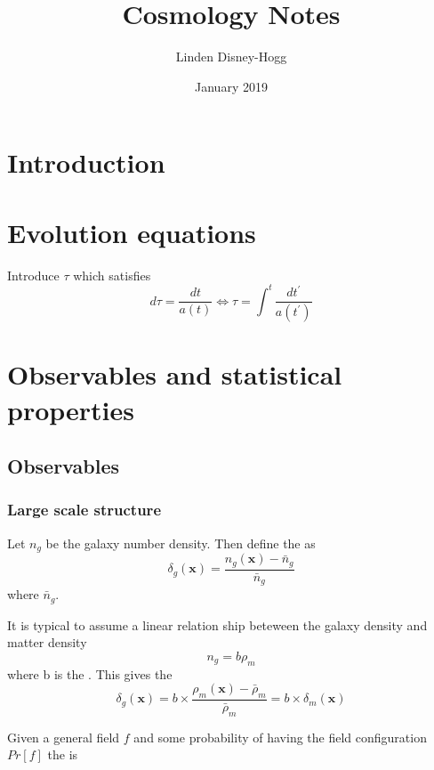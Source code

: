 \documentclass{article}
\title{Cosmology Notes}
\author{Linden Disney-Hogg}
\date{January 2019}
\begin{document}
\maketitle
\tableofcontents

\section{Introduction}
\section{Evolution equations}

\begin{definition}
Introduce  $\tau$ which satisfies 
\[
d\tau = \frac{dt}{a(t)} \Leftrightarrow \tau = \int^t \frac{dt^\prime}{a(t^\prime)}
\]
\end{definition}


\section{Observables and statistical properties}
\subsection{Observables}
\subsubsection*{Large scale structure}
\begin{definition}
Let $n_g$ be the galaxy number density. Then define the  as 
\[
\delta_g(\bm{x}) = \frac{n_g(\bm{x})-\bar{n}_g}{\bar{n}_g}
\]
where $\bar{n}_g$. 
\end{definition}

It is typical to assume a linear relation ship beteween the galaxy density and matter density 
\[
n_g = b \rho_m
\]
where b is the . This gives the 
\[
\delta_g(\bm{x}) = b \times \frac{\rho_m(\bm{x})-\bar{\rho}_m}{\bar{\rho}_m} = b \times \delta_m(\bm{x})
\]

\begin{definition}
Given a general field $f$ and some probability of having the field configuration $Pr[f]$ the  is 
\end{definition}
\end{document}
